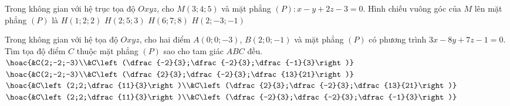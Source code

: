 \begin{ex}%
	Trong không gian với hệ trục tọa độ $Oxyz$, cho $M (3;4;5)$ và mặt phẳng $(P): x-y+2z-3=0$. Hình chiếu vuông góc của $M$ lên mặt phẳng $(P)$ là
	\choice 
	{$H(1;2;2)$}
	{\True $H(2;5;3)$}
	{$H(6;7;8)$}
	{$H(2;-3;-1)$}
\end{ex}
\begin{ex}%
	Trong không gian với hệ tọa độ $Oxyz$, cho hai điểm $A(0;0;-3)$, $B(2;0;-1)$ và mặt phẳng $(P)$ có phương trình $3x-8y+7z-1=0$. Tìm tọa độ điểm $C$ thuộc mặt phẳng $(P)$ sao cho tam giác $ABC$ đều.
	\choice
	{\True $\hoac{&C(2;-2;-3)\\&C\left(\dfrac{-2}{3};\dfrac{-2}{3};\dfrac{-1}{3}\right)}$}
	{$\hoac{&C(2;-2;-3)\\&C\left(\dfrac{2}{3};\dfrac{-2}{3};\dfrac{13}{21}\right)}$}
	{$\hoac{&C\left(2;2;\dfrac{11}{3}\right)\\&C\left(\dfrac{2}{3};\dfrac{-2}{3};\dfrac{13}{21}\right)}$}
	{$\hoac{&C\left(2;2;\dfrac{11}{3}\right)\\&C\left(\dfrac{-2}{3};\dfrac{-2}{3};\dfrac{-1}{3}\right)}$}
\end{ex}

